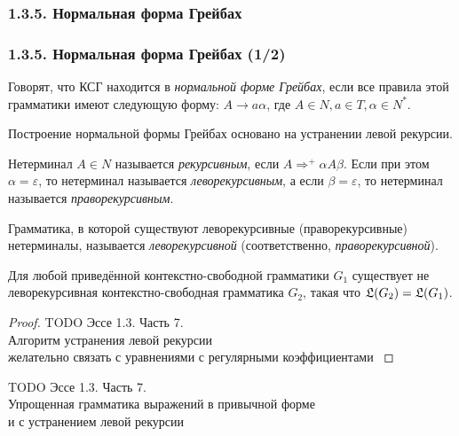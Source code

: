 \documentclass[mathserif,12pt,aspectratio=169]{beamer}
\renewcommand{\index}[1]{}
\def\odmkey#1#2{{\it\color{red} #1}\index{#2}}
\def\TODO#1{{\color{gray} TODO {#1}}}
\begin{document}
\subsubsection{1.3.5. Нормальная форма Грейбах}\label{1.3.5.}
\begin{frame}
\frametitle{1.3.5. Нормальная форма Грейбах (1/2)}
%
%

Говорят, что КСГ находится в 
\odmkey{нормальной форме Грейбах}{Нормальная форма!Грейбах}, если все правила этой грамматики
имеют следующую форму: 
$A\to a\alpha$, где $A \in N, a\in T, \alpha\in N^*$. 

Построение нормальной формы Грейбах 
основано на устранении левой рекурсии.

Нетерминал $A\in N$ называется 
\odmkey{рекурсивным}{Нетерминал!рекурсивный},
если $A\Rightarrow^+\alpha A \beta$. 
Если при этом $\alpha =\varepsilon$, то
нетерминал называется 
\odmkey{леворекурсивным}{Нетерминал!леворекурсивный},
а если $\beta =\varepsilon$, то
нетерминал называется 
\odmkey{праворекурсивным}{Нетерминал!праворекурсивный}.

\medskip
Грамматика, в которой существуют леворекурсивные
(праворекурсивные) нетерминалы,
называется 
\odmkey{леворекурсивной}{Грамматика!леворекурсивная} (соответственно, \odmkey{праворекурсивной}{Грамматика!праворекурсивная}).


\begin{theorem}
Для любой приведённой контекстно-свободной грамматики $G_1$
существует не леворекурсивная контекстно-свободная грамматика $G_2$,
такая что  $\frak{L}(G_2)=\frak{L}(G_1)$.
\end{theorem}

\begin{proof}
\TODO{Эссе 1.3. Часть 7. \\Алгоритм устранения левой рекурсии
\\желательно связать с уравнениями с регулярными коэффициентами 
}
\end{proof}

\begin{example}
\TODO{Эссе 1.3. Часть 7. \\Упрощенная грамматика выражений в привычной форме\\ и с устранением левой рекурсии }
\end{example}

\end{frame}
\end{document}
